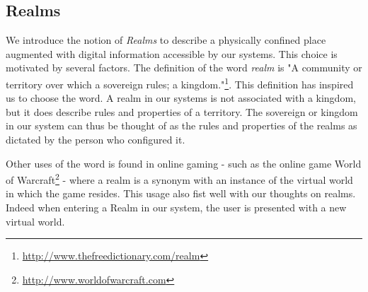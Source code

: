 \subsection{Realms} %
\label{sub:realms}
We introduce the notion of \emph{Realms} to describe a physically confined place augmented with digital information accessible by our systems. This choice is motivated by several factors. The definition of the word \emph{realm} is "A community or territory over which a sovereign rules; a kingdom."\footnote{\url{http://www.thefreedictionary.com/realm}}. This definition has inspired us to choose the word. A realm in our systems is not associated with a kingdom, but it does describe rules and properties of a territory. The sovereign or kingdom in our system can thus be thought of as the rules and properties of the realms as dictated by the person who configured it. 

Other uses of the word is found in online gaming - such as the online game World of Warcraft\footnote{\url{http://www.worldofwarcraft.com}} - where a realm is a synonym with an instance of the virtual world in which the game resides. This usage also fist well with our thoughts on realms. Indeed when entering a Realm in our system, the user is presented with a new virtual world.



